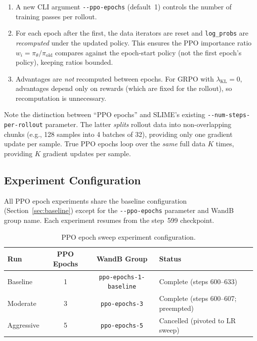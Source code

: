 \documentclass[11pt,a4paper]{article}
\begin{document}
\begin{enumerate}[leftmargin=*]
  \item A new CLI argument \texttt{-{}-ppo-epochs} (default~1) controls the
    number of training passes per rollout.
  \item For each epoch after the first, the data iterators are reset and
    \texttt{log\_probs} are \emph{recomputed} under the updated policy.
    This ensures the PPO importance ratio $w_i = \pi_\theta / \pi_{\mathrm{old}}$
    compares against the epoch-start policy (not the first epoch's policy),
    keeping ratios bounded.
  \item Advantages are \emph{not} recomputed between epochs. For GRPO with
    $\lambda_{\mathrm{KL}} = 0$, advantages depend only on rewards (which are
    fixed for the rollout), so recomputation is unnecessary.
\end{enumerate}

Note the distinction between ``PPO epochs'' and SLIME's existing
\texttt{-{}-num-steps-per-rollout} parameter. The latter \emph{splits} rollout
data into non-overlapping chunks (e.g., 128 samples into 4 batches of 32),
providing only one gradient update per sample. True PPO epochs loop over the
\emph{same} full data $K$ times, providing $K$ gradient updates per sample.

\subsection{Experiment Configuration}

All PPO epoch experiments share the baseline configuration (Section~\ref{sec:baseline})
except for the \texttt{-{}-ppo-epochs} parameter and WandB group name. Each
experiment resumes from the step~599 checkpoint.

\begin{table}[H]
\centering
\caption{PPO epoch sweep experiment configuration.}
\label{tab:ppo_sweep_config}
\begin{tabular}{@{}lccl@{}}
\toprule
\textbf{Run} & \textbf{PPO Epochs} & \textbf{WandB Group} & \textbf{Status} \\
\midrule
Baseline     & 1  & \texttt{ppo-epochs-1-baseline} & Complete (steps 600--633) \\
Moderate     & 3  & \texttt{ppo-epochs-3}          & Complete (steps 600--607; preempted) \\
Aggressive   & 5  & \texttt{ppo-epochs-5}          & Cancelled (pivoted to LR sweep) \\
\bottomrule
\end{tabular}
\end{table}
\end{document}
